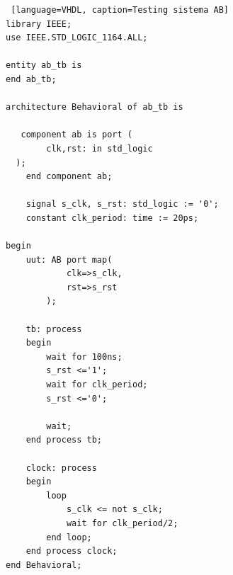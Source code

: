 \begin{lstlisting} [language=VHDL, caption=Testing sistema AB]
library IEEE;
use IEEE.STD_LOGIC_1164.ALL;

entity ab_tb is
end ab_tb;

architecture Behavioral of ab_tb is

   component ab is port (         
        clk,rst: in std_logic        
  );
    end component ab;

    signal s_clk, s_rst: std_logic := '0';
    constant clk_period: time := 20ps;

begin
    uut: AB port map(
            clk=>s_clk,         
            rst=>s_rst
        );

    tb: process
    begin
        wait for 100ns;
        s_rst <='1';
        wait for clk_period;
        s_rst <='0';
        
        wait;
    end process tb;

    clock: process
    begin
        loop
            s_clk <= not s_clk;
            wait for clk_period/2;
        end loop;
    end process clock;
end Behavioral;
\end{lstlisting}

